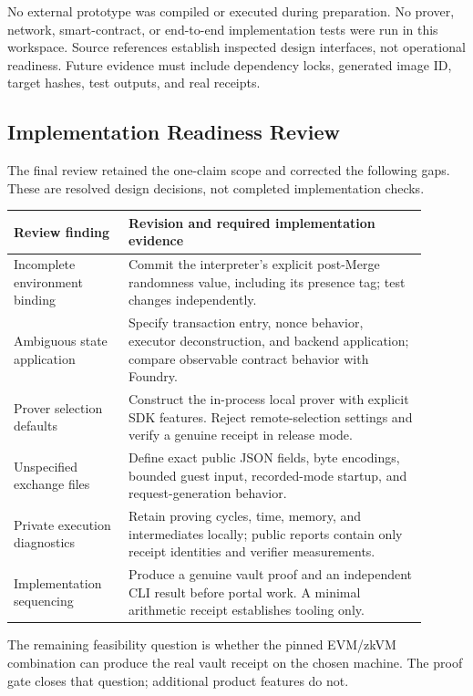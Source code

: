 \documentclass[11pt]{article}
\begin{document}
No external prototype was compiled or executed during preparation. No prover, network, smart-contract, or end-to-end implementation tests were run in this workspace. Source references establish inspected design interfaces, not operational readiness. Future evidence must include dependency locks, generated image ID, target hashes, test outputs, and real receipts.

\subsection{Implementation Readiness Review}
The final review retained the one-claim scope and corrected the following gaps. These are resolved design decisions, not completed implementation checks.
\begin{longtable}{L{0.25\linewidth}L{0.65\linewidth}}
\toprule
\textbf{Review finding} & \textbf{Revision and required implementation evidence} \\
\midrule
\endhead
Incomplete environment binding & Commit the interpreter's explicit post-Merge randomness value, including its presence tag; test changes independently. \\
Ambiguous state application & Specify transaction entry, nonce behavior, executor deconstruction, and backend application; compare observable contract behavior with Foundry. \\
Prover selection defaults & Construct the in-process local prover with explicit SDK features. Reject remote-selection settings and verify a genuine receipt in release mode. \\
Unspecified exchange files & Define exact public JSON fields, byte encodings, bounded guest input, recorded-mode startup, and request-generation behavior. \\
Private execution diagnostics & Retain proving cycles, time, memory, and intermediates locally; public reports contain only receipt identities and verifier measurements. \\
Implementation sequencing & Produce a genuine vault proof and an independent CLI result before portal work. A minimal arithmetic receipt establishes tooling only. \\
\bottomrule
\end{longtable}
The remaining feasibility question is whether the pinned EVM/zkVM combination can produce the real vault receipt on the chosen machine. The proof gate closes that question; additional product features do not.
\end{document}

